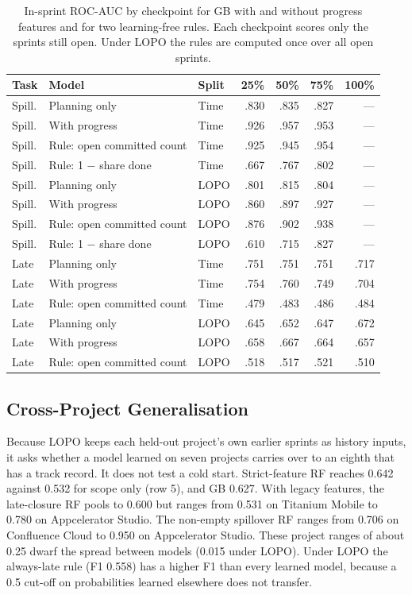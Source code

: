 \documentclass[conference]{IEEEtran}
\begin{document}
\begin{table}[!t]
\centering\scriptsize
\caption{In-sprint ROC-AUC by checkpoint for GB with and without progress features and for two learning-free rules. Each checkpoint scores only the sprints still open. Under LOPO the rules are computed once over all open sprints.}
\label{tab:insprint}
\setlength{\tabcolsep}{6pt}
\begin{tabular}{lllrrrr}
\hline
Task & Model & Split & 25\% & 50\% & 75\% & 100\%\\
\hline
Spill. & Planning only & Time & .830 & .835 & .827 & ---\\
Spill. & With progress & Time & .926 & .957 & .953 & ---\\
Spill. & Rule: open committed count & Time & .925 & .945 & .954 & ---\\
Spill. & Rule: 1 $-$ share done & Time & .667 & .767 & .802 & ---\\
Spill. & Planning only & LOPO & .801 & .815 & .804 & ---\\
Spill. & With progress & LOPO & .860 & .897 & .927 & ---\\
Spill. & Rule: open committed count & LOPO & .876 & .902 & .938 & ---\\
Spill. & Rule: 1 $-$ share done & LOPO & .610 & .715 & .827 & ---\\
Late & Planning only & Time & .751 & .751 & .751 & .717\\
Late & With progress & Time & .754 & .760 & .749 & .704\\
Late & Rule: open committed count & Time & .479 & .483 & .486 & .484\\
Late & Planning only & LOPO & .645 & .652 & .647 & .672\\
Late & With progress & LOPO & .658 & .667 & .664 & .657\\
Late & Rule: open committed count & LOPO & .518 & .517 & .521 & .510\\
\hline
\end{tabular}
\end{table}

\subsection{Cross-Project Generalisation}
\label{sec:lopo}

Because LOPO keeps each held-out project's own earlier sprints as history inputs, it asks whether a model learned on seven projects carries over to an eighth that has a track record. It does not test a cold start. Strict-feature RF reaches 0.642 against 0.532 for scope only (row 5), and GB 0.627. With legacy features, the late-closure RF pools to 0.600 but ranges from 0.531 on Titanium Mobile to 0.780 on Appcelerator Studio. The non-empty spillover RF ranges from 0.706 on Confluence Cloud to 0.950 on Appcelerator Studio. These project ranges of about 0.25 dwarf the spread between models (0.015 under LOPO). Under LOPO the always-late rule (F1 0.558) has a higher F1 than every learned model, because a 0.5 cut-off on probabilities learned elsewhere does not transfer.
\end{document}
